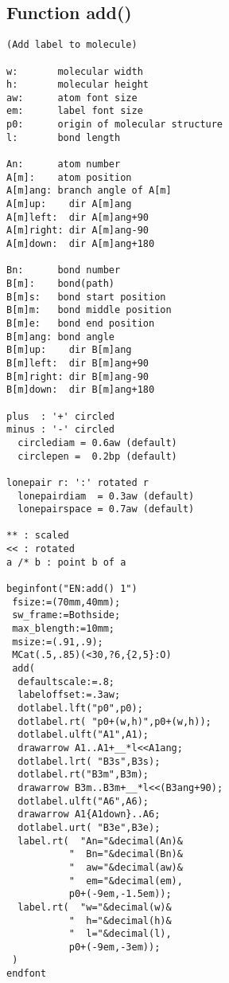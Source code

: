 \documentclass[a4paper]{article}
\begin{document}
\subsection{Function add()}
%
%
%
%
%
%
%
%
%
%
%
%
%
%
\index{/*}%
\index{**}%
\index{\textgreater\textgreater}%
%
%
%
%
%
%
%
%
%
%
%
%
%
%
%
%
%
%
%
\begin{verbatim}
(Add label to molecule)

w:       molecular width
h:       molecular height
aw:      atom font size
em:      label font size
p0:      origin of molecular structure
l:       bond length

An:      atom number
A[m]:    atom position
A[m]ang: branch angle of A[m]
A[m]up:    dir A[m]ang
A[m]left:  dir A[m]ang+90
A[m]right: dir A[m]ang-90
A[m]down:  dir A[m]ang+180

Bn:      bond number
B[m]:    bond(path)
B[m]s:   bond start position
B[m]m:   bond middle position
B[m]e:   bond end position
B[m]ang: bond angle
B[m]up:    dir B[m]ang
B[m]left:  dir B[m]ang+90
B[m]right: dir B[m]ang-90
B[m]down:  dir B[m]ang+180

plus  : '+' circled
minus : '-' circled
  circlediam = 0.6aw (default)
  circlepen =  0.2bp (default)

lonepair r: ':' rotated r
  lonepairdiam  = 0.3aw (default)
  lonepairspace = 0.7aw (default)

** : scaled
<< : rotated
a /* b : point b of a

beginfont("EN:add() 1")
 fsize:=(70mm,40mm);
 sw_frame:=Bothside;
 max_blength:=10mm;
 msize:=(.91,.9);
 MCat(.5,.85)(<30,?6,{2,5}:O)
 add(
  defaultscale:=.8;
  labeloffset:=.3aw;
  dotlabel.lft("p0",p0);
  dotlabel.rt( "p0+(w,h)",p0+(w,h));
  dotlabel.ulft("A1",A1);
  drawarrow A1..A1+__*l<<A1ang;
  dotlabel.lrt( "B3s",B3s);
  dotlabel.rt("B3m",B3m);
  drawarrow B3m..B3m+__*l<<(B3ang+90);
  dotlabel.ulft("A6",A6);
  drawarrow A1{A1down}..A6;
  dotlabel.urt( "B3e",B3e);
  label.rt(  "An="&decimal(An)&
           "  Bn="&decimal(Bn)&
           "  aw="&decimal(aw)&
           "  em="&decimal(em),
           p0+(-9em,-1.5em));
  label.rt(  "w="&decimal(w)&
           "  h="&decimal(h)&
           "  l="&decimal(l),
           p0+(-9em,-3em));
 )
endfont
\end{verbatim}
\end{document}
